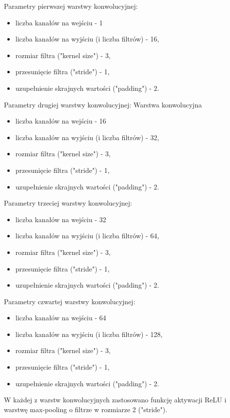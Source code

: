 \documentclass{sprz}
\begin{document}
Parametry pierwszej warstwy konwolucyjnej:
\begin{itemize}
  \item{liczba kanałów na wejściu - 1}
  \item{liczba kanałów na wyjściu (i liczba filtrów) - 16,}
  \item{rozmiar filtra ("kernel size") - 3,}
  \item {przesunięcie filtra ("stride") - 1,}
  \item{uzupełnienie skrajnych wartości ("padding") - 2.}
\end{itemize}


Parametry drugiej warstwy konwolucyjnej:
Warstwa konwolucyjna
\begin{itemize}
  \item{liczba kanałów na wejściu - 16}
  \item{liczba kanałów na wyjściu (i liczba filtrów) - 32,}
  \item{rozmiar filtra ("kernel size") - 3,}
  \item {przesunięcie filtra ("stride") - 1,}
  \item{uzupełnienie skrajnych wartości ("padding") - 2.}
\end{itemize}


Parametry trzeciej warstwy konwolucyjnej:
\begin{itemize}
  \item{liczba kanałów na wejściu - 32}
  \item{liczba kanałów na wyjściu (i liczba filtrów) - 64,}
  \item{rozmiar filtra ("kernel size") - 3,}
  \item {przesunięcie filtra ("stride") - 1,}
  \item{uzupełnienie skrajnych wartości ("padding") - 2.}
\end{itemize}

Parametry czwartej warstwy konwolucyjnej:
\begin{itemize}
  \item{liczba kanałów na wejściu - 64}
  \item{liczba kanałów na wyjściu (i liczba filtrów) - 128,}
  \item{rozmiar filtra ("kernel size") - 3,}
  \item {przesunięcie filtra ("stride") - 1,}
  \item{uzupełnienie skrajnych wartości ("padding") - 2.}
\end{itemize}


W każdej z warstw konwolucyjnych zastosowano funkcję aktywacji ReLU i warstwę max-pooling o filtrze w rozmiarze 2 ("stride").
\end{document}
